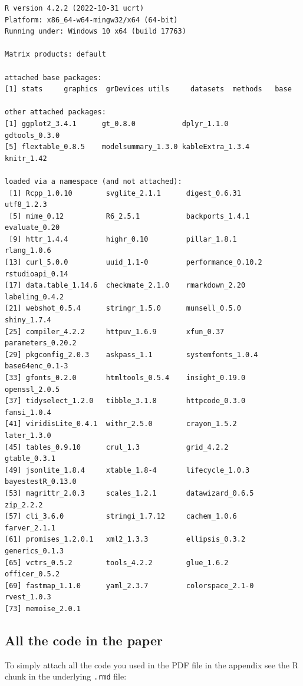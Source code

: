 \documentclass[
  letterpaper,
  DIV=11,
  numbers=noendperiod]{scrartcl}
\begin{document}
\begin{verbatim}
R version 4.2.2 (2022-10-31 ucrt)
Platform: x86_64-w64-mingw32/x64 (64-bit)
Running under: Windows 10 x64 (build 17763)

Matrix products: default

attached base packages:
[1] stats     graphics  grDevices utils     datasets  methods   base     

other attached packages:
[1] ggplot2_3.4.1      gt_0.8.0           dplyr_1.1.0        gdtools_0.3.0     
[5] flextable_0.8.5    modelsummary_1.3.0 kableExtra_1.3.4   knitr_1.42        

loaded via a namespace (and not attached):
 [1] Rcpp_1.0.10        svglite_2.1.1      digest_0.6.31      utf8_1.2.3        
 [5] mime_0.12          R6_2.5.1           backports_1.4.1    evaluate_0.20     
 [9] httr_1.4.4         highr_0.10         pillar_1.8.1       rlang_1.0.6       
[13] curl_5.0.0         uuid_1.1-0         performance_0.10.2 rstudioapi_0.14   
[17] data.table_1.14.6  checkmate_2.1.0    rmarkdown_2.20     labeling_0.4.2    
[21] webshot_0.5.4      stringr_1.5.0      munsell_0.5.0      shiny_1.7.4       
[25] compiler_4.2.2     httpuv_1.6.9       xfun_0.37          parameters_0.20.2 
[29] pkgconfig_2.0.3    askpass_1.1        systemfonts_1.0.4  base64enc_0.1-3   
[33] gfonts_0.2.0       htmltools_0.5.4    insight_0.19.0     openssl_2.0.5     
[37] tidyselect_1.2.0   tibble_3.1.8       httpcode_0.3.0     fansi_1.0.4       
[41] viridisLite_0.4.1  withr_2.5.0        crayon_1.5.2       later_1.3.0       
[45] tables_0.9.10      crul_1.3           grid_4.2.2         gtable_0.3.1      
[49] jsonlite_1.8.4     xtable_1.8-4       lifecycle_1.0.3    bayestestR_0.13.0 
[53] magrittr_2.0.3     scales_1.2.1       datawizard_0.6.5   zip_2.2.2         
[57] cli_3.6.0          stringi_1.7.12     cachem_1.0.6       farver_2.1.1      
[61] promises_1.2.0.1   xml2_1.3.3         ellipsis_0.3.2     generics_0.1.3    
[65] vctrs_0.5.2        tools_4.2.2        glue_1.6.2         officer_0.5.2     
[69] fastmap_1.1.0      yaml_2.3.7         colorspace_2.1-0   rvest_1.0.3       
[73] memoise_2.0.1     
\end{verbatim}

\hypertarget{all-the-code-in-the-paper}{%
\subsection{All the code in the paper}\label{all-the-code-in-the-paper}}

To simply attach all the code you used in the PDF file in the appendix
see the R chunk in the underlying \texttt{.rmd} file:
\end{document}
